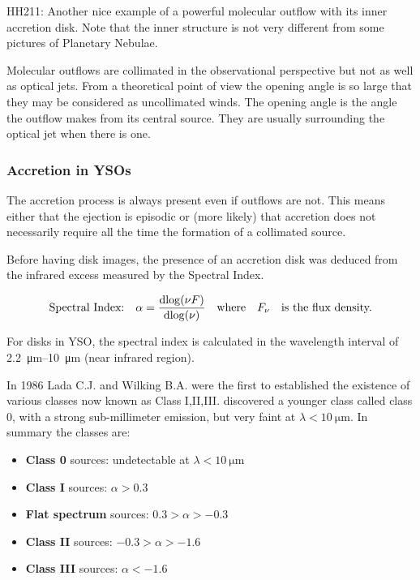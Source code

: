 \documentclass[10pt,a4paper,english]{article}
\begin{document}
HH211: Another nice example of a powerful molecular outflow with its inner
accretion disk. Note that the inner structure is not very different from some
pictures of Planetary Nebulae.

Molecular outflows are collimated in the observational perspective but not as
well as optical jets. From a theoretical point of view the opening angle is so
large that they may be considered as uncollimated winds. The opening angle is
the angle the outflow makes from its central source. They are usually
surrounding the optical jet when there is one.

\subsubsection{Accretion in YSOs}

The accretion process is always present even if outflows are not. This means
either that the ejection is episodic or (more likely) that accretion does not
necessarily require all the time the formation of a collimated source.

Before having disk images, the presence of an accretion disk was deduced from
the infrared excess measured by the Spectral Index.

\[
    \text{Spectral Index:}\quad \alpha=\frac{\mathrm{d}{\log(\nu F)}}{\mathrm{d}{
    \log(\nu)}}\quad\text{where}\quad F_{\nu}\quad\text{is the flux density.}
\]


For disks in YSO, the spectral index is calculated in the wavelength interval
of \SIrange{2.2}{10}{\um} (near infrared region).

In 1986 Lada C.J. and Wilking B.A. were the first to established the existence
of various classes now known as Class I,II,III. \cite{1993ApJ...406..122A} discovered
a younger class called class 0, with a strong sub-millimeter emission, but very
faint at $\lambda<\SI{10}{\um}$. In summary the classes are:
\begin{itemize}
    \item \textbf{Class 0} sources: undetectable at $\lambda<\SI{10}{\um}$
    \item \textbf{Class I} sources: $\alpha>0.3$
    \item \textbf{Flat spectrum} sources: $0.3>\alpha>-0.3$
    \item \textbf{Class II} sources: $-0.3>\alpha>-1.6$
    \item \textbf{Class III} sources: $\alpha<-1.6$
\end{itemize}
\end{document}
